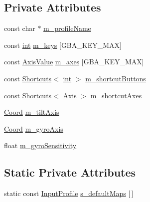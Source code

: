 \subsection*{Private Attributes}
\begin{DoxyCompactItemize}
\item 
const char $\ast$ \mbox{\hyperlink{class_q_g_b_a_1_1_input_profile_afbdc1197b6da3329c6035a7f42671341}{m\+\_\+profile\+Name}}
\item 
const \mbox{\hyperlink{ioapi_8h_a787fa3cf048117ba7123753c1e74fcd6}{int}} \mbox{\hyperlink{class_q_g_b_a_1_1_input_profile_ae211c44b2068e8e8d00471ac04a43b36}{m\+\_\+keys}} \mbox{[}G\+B\+A\+\_\+\+K\+E\+Y\+\_\+\+M\+AX\mbox{]}
\item 
const \mbox{\hyperlink{class_q_g_b_a_1_1_input_profile_struct_q_g_b_a_1_1_input_profile_1_1_axis_value}{Axis\+Value}} \mbox{\hyperlink{class_q_g_b_a_1_1_input_profile_a9ddf4d7f8bcc8915208837d814a052a6}{m\+\_\+axes}} \mbox{[}G\+B\+A\+\_\+\+K\+E\+Y\+\_\+\+M\+AX\mbox{]}
\item 
const \mbox{\hyperlink{class_q_g_b_a_1_1_input_profile_struct_q_g_b_a_1_1_input_profile_1_1_shortcuts}{Shortcuts}}$<$ \mbox{\hyperlink{ioapi_8h_a787fa3cf048117ba7123753c1e74fcd6}{int}} $>$ \mbox{\hyperlink{class_q_g_b_a_1_1_input_profile_abaa813b9246b03e916477cef8c654529}{m\+\_\+shortcut\+Buttons}}
\item 
const \mbox{\hyperlink{class_q_g_b_a_1_1_input_profile_struct_q_g_b_a_1_1_input_profile_1_1_shortcuts}{Shortcuts}}$<$ \mbox{\hyperlink{class_q_g_b_a_1_1_input_profile_struct_q_g_b_a_1_1_input_profile_1_1_axis}{Axis}} $>$ \mbox{\hyperlink{class_q_g_b_a_1_1_input_profile_af08088f0a9e5aefec1296531d9e729a0}{m\+\_\+shortcut\+Axes}}
\item 
\mbox{\hyperlink{class_q_g_b_a_1_1_input_profile_struct_q_g_b_a_1_1_input_profile_1_1_coord}{Coord}} \mbox{\hyperlink{class_q_g_b_a_1_1_input_profile_a313dab9d850ea2aee0ed75f8b479eada}{m\+\_\+tilt\+Axis}}
\item 
\mbox{\hyperlink{class_q_g_b_a_1_1_input_profile_struct_q_g_b_a_1_1_input_profile_1_1_coord}{Coord}} \mbox{\hyperlink{class_q_g_b_a_1_1_input_profile_ac7485af5eed8bcb841e4803aa8635b2e}{m\+\_\+gyro\+Axis}}
\item 
float \mbox{\hyperlink{class_q_g_b_a_1_1_input_profile_afbd44900858946051dbd7a31370db124}{m\+\_\+gyro\+Sensitivity}}
\end{DoxyCompactItemize}
\subsection*{Static Private Attributes}
\begin{DoxyCompactItemize}
\item 
static const \mbox{\hyperlink{class_q_g_b_a_1_1_input_profile}{Input\+Profile}} \mbox{\hyperlink{class_q_g_b_a_1_1_input_profile_af860057f592236db98588b4049cc3dff}{s\+\_\+default\+Maps}} \mbox{[}$\,$\mbox{]}
\end{DoxyCompactItemize}


